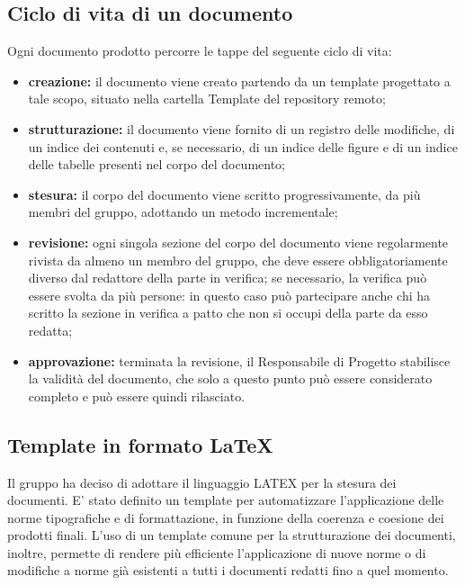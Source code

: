 \subsection{Ciclo di vita di un documento}\label{3.1.3}
Ogni documento prodotto percorre le tappe del seguente ciclo di vita:
\begin{itemize}
\item \textbf{creazione:} il documento viene creato partendo da un template progettato a tale
	scopo, situato nella cartella Template del repository remoto;
	\item \textbf{strutturazione:} il documento viene fornito di un registro delle modifiche, di un indice dei   contenuti e, se necessario, di un indice delle figure e di un indice delle tabelle presenti nel corpo del documento;
		\item \textbf{stesura:} il corpo del documento viene scritto progressivamente, da più membri del gruppo, adottando un metodo incrementale;
			\item \textbf{revisione:} ogni singola sezione del corpo del documento viene regolarmente rivista da almeno un membro del gruppo, che deve essere obbligatoriamente diverso dal redattore della parte in verifica; se necessario, la verifica può essere svolta da più persone: in questo caso può partecipare anche chi ha scritto la sezione in verifica a patto che non si occupi della parte da esso redatta;
				\item \textbf{approvazione:} terminata la revisione, il Responsabile di Progetto stabilisce la validità del documento, che solo a questo punto può essere considerato completo e può essere quindi rilasciato.
\end{itemize}
\subsection{Template in formato \LaTeX}\label{3.1.4}
Il gruppo ha deciso di adottare il linguaggio LATEX per la stesura dei documenti. E' stato definito un template per automatizzare l’applicazione delle norme tipografiche e di formattazione, in funzione della coerenza e coesione dei prodotti finali.
L’uso di un template comune per la strutturazione dei documenti, inoltre, permette di rendere più efficiente l’applicazione di nuove norme o di modifiche a norme già esistenti a tutti i documenti redatti fino a quel momento.
